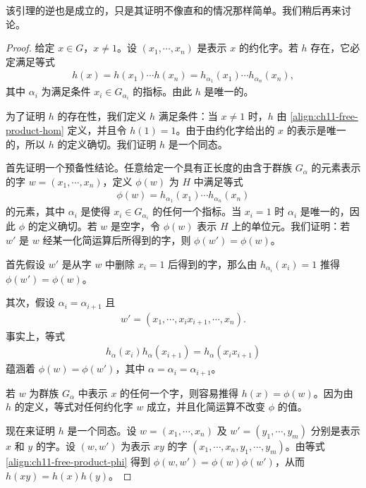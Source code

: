 \documentclass[../../main.tex]{subfiles}
\begin{document}
该引理的逆也是成立的，只是其证明不像直和的情况那样简单。我们稍后再来讨论。

\begin{proof}
给定 $x\in G$，$x\neq 1$。设 $(x_1,\cdots,x_n)$ 是表示 $x$ 的约化字。若 $h$ 存在，它必定满足等式
\begin{align}
h(x)=h(x_1)\cdots h(x_n)=h_{\alpha_1}(x_1)\cdots h_{\alpha_n}(x_n),\label{align:ch11-free-product-hom}
\end{align}
其中 $\alpha_i$ 为满足条件 $x_i\in G_{\alpha_i}$ 的指标。由此 $h$ 是唯一的。

为了证明 $h$ 的存在性，我们定义 $h$ 满足条件：当 $x\neq 1$ 时，$h$ 由 \eqref{align:ch11-free-product-hom} 定义，并且令 $h(1)=1$。由于由约化字给出的 $x$ 的表示是唯一的，所以 $h$ 的定义确切。我们证明 $h$ 是一个同态。

首先证明一个预备性结论。任意给定一个具有正长度的由含于群族 $G_\alpha$ 的元素表示的字 $w=(x_1,\cdots,x_n)$，定义 $\phi(w)$ 为 $H$ 中满足等式
\begin{align}
\phi(w)=h_{\alpha_1}(x_1)\cdots h_{\alpha_n}(x_n)\label{align:ch11-free-product-phi}
\end{align}
的元素，其中 $\alpha_i$ 是使得 $x_i\in G_{\alpha_i}$ 的任何一个指标。当 $x_i=1$ 时 $\alpha_i$ 是唯一的，因此 $\phi$ 的定义确切。若 $w$ 是空字，令 $\phi(w)$ 表示 $H$ 上的单位元。我们证明：若 $w'$ 是 $w$ 经某一化简运算后所得到的字，则 $\phi(w')=\phi(w)$。

首先假设 $w'$ 是从字 $w$ 中删除 $x_i=1$ 后得到的字，那么由 $h_{\alpha_i}(x_i)=1$ 推得 $\phi(w')=\phi(w)$。

其次，假设 $\alpha_i=\alpha_{i+1}$ 且
\begin{align*}
w'=(x_1,\cdots,x_i x_{i+1},\cdots,x_n).
\end{align*}
事实上，等式
\begin{align*}
h_\alpha(x_i)h_\alpha(x_{i+1})=h_\alpha(x_i x_{i+1})
\end{align*}
蕴涵着 $\phi(w)=\phi(w')$，其中 $\alpha=\alpha_i=\alpha_{i+1}$。

若 $w$ 为群族 $G_\alpha$ 中表示 $x$ 的任何一个字，则容易推得 $h(x)=\phi(w)$。因为由 $h$ 的定义，等式对任何约化字 $w$ 成立，并且化简运算不改变 $\phi$ 的值。

现在来证明 $h$ 是一个同态。设 $w=(x_1,\cdots,x_n)$ 及 $w'=(y_1,\cdots,y_m)$ 分别是表示 $x$ 和 $y$ 的字。设 $(w,w')$ 为表示 $xy$ 的字 $(x_1,\cdots,x_n,y_1,\cdots,y_m)$。由等式 \eqref{align:ch11-free-product-phi} 得到 $\phi(w,w')=\phi(w)\phi(w')$，从而 $h(xy)=h(x)h(y)$。
\end{proof}
\end{document}
